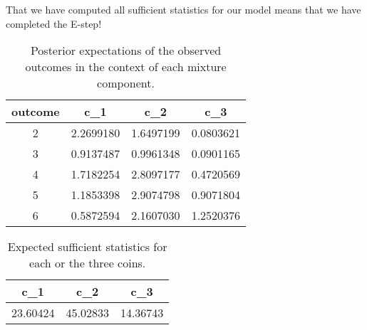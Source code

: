 \documentclass[11pt,leqno,a4paper]{report}\usepackage[]{graphicx}\usepackage[]{color}
\begin{document}
That we have computed all sufficient statistics
for our model means that we have completed the E-step!

\begin{table}
\center

\begin{tabular}{c|c|c|c}
\hline
outcome & c\_1 & c\_2 & c\_3\\
\hline
2 & 2.2699180 & 1.6497199 & 0.0803621\\
\hline
3 & 0.9137487 & 0.9961348 & 0.0901165\\
\hline
4 & 1.7182254 & 2.8097177 & 0.4720569\\
\hline
5 & 1.1853398 & 2.9074798 & 0.9071804\\
\hline
6 & 0.5872594 & 2.1607030 & 1.2520376\\
\hline
\end{tabular}


\caption{Posterior expectations of the observed outcomes in the context of each mixture component.}
\label{tab:binomCounts}
\end{table}

\begin{table}
\center 

\begin{tabular}{c|c|c}
\hline
c\_1 & c\_2 & c\_3\\
\hline
23.60424 & 45.02833 & 14.36743\\
\hline
\end{tabular}


\caption{Expected sufficient statistics for each or the three coins.}
\label{tab:binomPosteriors}
\end{table}
\end{document}
